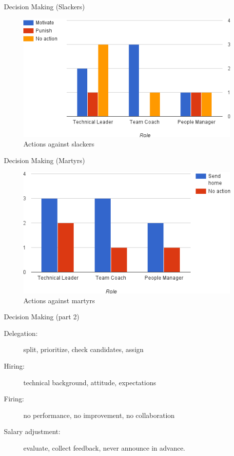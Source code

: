 \documentclass{beamer}
\begin{document}
\begin{frame}{Decision Making (Slackers) }
\begin{figure}[h]
  \centering
  \includegraphics[scale=0.6]{slacker.png}
  \caption{Actions against slackers}
  \label{fig:axbgrid}
\end{figure}
\end{frame}

\begin{frame}{Decision Making (Martyrs)}
\begin{figure}[h]
  \centering
  \includegraphics[scale=0.6]{marthyr.png}
  \caption{Actions against martyrs}
  \label{fig:axbgrid}
\end{figure}
\end{frame}

\begin{frame}{Decision Making (part 2)}
\begin{description}
\item[Delegation:] split, prioritize, check candidates, assign
\item[Hiring:] technical background, attitude, expectations
\item[Firing:] no performance, no improvement, no collaboration
\item[Salary adjustment:] evaluate, collect feedback, never announce in advance.
\end{description}
\end{frame}
\end{document}
